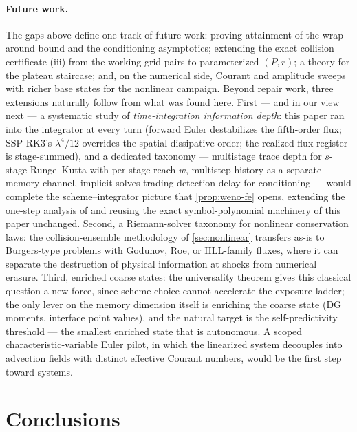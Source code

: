 \documentclass[pdflatex,sn-mathphys-num]{sn-jnl}%
\theoremstyle{thmstyleone}%
\theoremstyle{thmstyletwo}%
\theoremstyle{thmstylethree}%
\begin{document}
\paragraph{Future work.}
The gaps above define one track of future work: proving attainment of the wrap-around bound and the conditioning asymptotics; extending the exact collision certificate (iii) from the working grid pairs to parameterized $(P,r)$; a theory for the plateau staircase; and, on the numerical side, Courant and amplitude sweeps with richer base states for the nonlinear campaign.
Beyond repair work, three extensions naturally follow from what was found here.
First --- and in our view next --- a systematic study of \emph{time-integration information depth}: this paper ran into the integrator at every turn (forward Euler destabilizes the fifth-order flux; SSP-RK3's $\lambda^4/12$ overrides the spatial dissipative order; the realized flux register is stage-summed), and a dedicated taxonomy --- multistage trace depth for $s$-stage Runge--Kutta with per-stage reach $w$, multistep history as a separate memory channel, implicit solves trading detection delay for conditioning --- would complete the scheme--integrator picture that \cref{prop:weno-fe} opens, extending the one-step analysis of \cite{PolemitisChristakisDrikakis2026onestep} and reusing the exact symbol-polynomial machinery of this paper unchanged.
Second, a Riemann-solver taxonomy for nonlinear conservation laws: the collision-ensemble methodology of \cref{sec:nonlinear} transfers as-is to Burgers-type problems with Godunov, Roe, or HLL-family fluxes, where it can separate the destruction of physical information at shocks from numerical erasure.
Third, enriched coarse states: the universality theorem gives this classical question a new force, since scheme choice cannot accelerate the exposure ladder; the only lever on the memory dimension itself is enriching the coarse state (DG moments, interface point values), and the natural target is the self-predictivity threshold --- the smallest enriched state that is autonomous.
A scoped characteristic-variable Euler pilot, in which the linearized system decouples into advection fields with distinct effective Courant numbers, would be the first step toward systems.

\section{Conclusions}\label{sec:conc}
\end{document}
